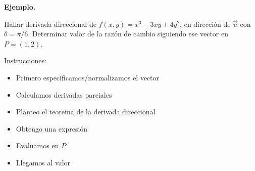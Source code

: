 \textbf{Ejemplo.}

Hallar derivada direccional de \(f(x,y) = x^{3} - 3xy + 4y^{2}\),
en dirección de \(\vec{u}\) con \(\theta = \pi/6\).
Determinar valor de la razón de cambio siguiendo ese vector en \(P = (1,2)\).

Instrucciones:
\begin{itemize}
    \item Primero especificamos/normalizamos el vector
    \item Calculamos derivadas parciales 
    \item Planteo el teorema de la derivada direccional 
    \item Obtengo una expresión
    \item Evaluamos en \(P\)
    \item Llegamos al valor
\end{itemize}